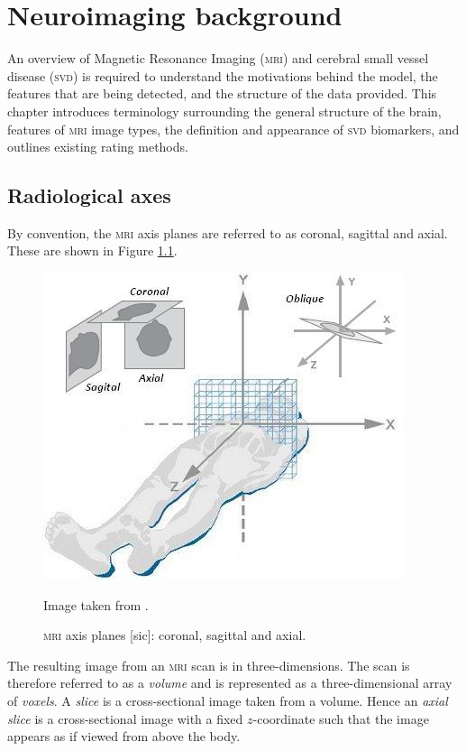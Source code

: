 %
%



\chapter{Neuroimaging background}\label{mri_svd_intro}

An overview of Magnetic Resonance Imaging (\textsc{mri}) and cerebral small vessel disease (\textsc{svd}) is required to understand the motivations behind the model, the features that are being detected, and the structure of the data provided. This chapter introduces terminology surrounding the general structure of the brain, features of \textsc{mri} image types, the definition and appearance of \textsc{svd} biomarkers, and outlines existing rating methods.

\section{Radiological axes}

By convention, the \textsc{mri} axis planes are referred to as coronal, sagittal and axial. These are shown in Figure \ref{svd-axes}.

\begin{figure}[ht]
	\centering
	\includegraphics[scale=0.8]{Images/2_axes2.jpg}
	\caption{\small{\textsc{mri} axis planes [sic]: coronal, sagittal and axial.}}
	\small Image taken from \cite{Bean2014}.
	\label{svd-axes}
\end{figure}

The resulting image from an \textsc{mri} scan is in three-dimensions. The scan is therefore referred to as a \textit{volume} and is represented as a three-dimensional array of \textit{voxels}. A \textit{slice} is a cross-sectional image taken from a volume. Hence an \textit{axial slice} is a cross-sectional image with a fixed $z$-coordinate such that the image appears as if viewed from above the body.

